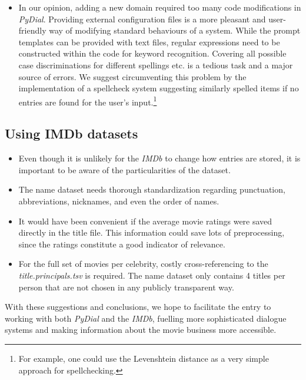 \documentclass[11pt,a4paper]{article}
\begin{document}
\begin{itemize}
\item In our opinion, adding a new domain required too many code modifications in \textit{PyDial}. Providing external configuration files is a more pleasant and user-friendly way of modifying standard behaviours of a system. While the prompt templates can be provided with text files, regular expressions need to be constructed within the code for keyword recognition. Covering all possible case discriminations for different spellings etc. is a tedious task and a major source of errors. We suggest circumventing this problem by the implementation of a spellcheck system suggesting similarly spelled items if no entries are found for the user's input.\footnote{For example, one could use the Levenshtein distance \citep{Levenshtein} as a very simple approach for spellchecking.} 
\end{itemize}
\newpage
\subsection{Using IMDb datasets}
\label{sec:conclusions-imdb} 
\begin{itemize}
\item Even though it is unlikely for the \textit{IMDb} to change how entries are stored, it is important to be aware of the particularities of the dataset.
\item The name dataset needs thorough standardization regarding punctuation, abbreviations, nicknames, and even the order of names.  
\item It would have been convenient if the average movie ratings were saved directly in the title file. This information could save lots of preprocessing, since the ratings constitute a good indicator of relevance. 
\item For the full set of movies per celebrity, costly cross-referencing to the \emph{title.principals.tsv} is required. The name dataset only contains 4 titles per person that are not chosen in any publicly transparent way.
\end{itemize}

With these suggestions and conclusions, we hope to facilitate the entry to working with both \textit{PyDial} and the \textit{IMDb}, fuelling more sophisticated dialogue systems and making information about the movie business more accessible.
\end{document}
